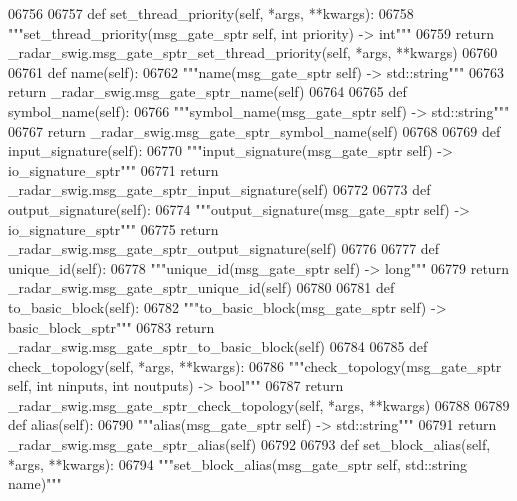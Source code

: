 \begin{DoxyCode}
{{{{{{{{{{{{{{{{{{{{{{06756 
06757     \textcolor{keyword}{def }set_thread_priority(self, *args, **kwargs):
06758         \textcolor{stringliteral}{"""set\_thread\_priority(msg\_gate\_sptr self, int priority) -> int"""}
06759         \textcolor{keywordflow}{return} \_radar\_swig.msg\_gate\_sptr\_set\_thread\_priority(self, *args, **kwargs)
06760 
06761     \textcolor{keyword}{def }name(self):
06762         \textcolor{stringliteral}{"""name(msg\_gate\_sptr self) -> std::string"""}
06763         \textcolor{keywordflow}{return} \_radar\_swig.msg\_gate\_sptr\_name(self)
06764 
06765     \textcolor{keyword}{def }symbol_name(self):
06766         \textcolor{stringliteral}{"""symbol\_name(msg\_gate\_sptr self) -> std::string"""}
06767         \textcolor{keywordflow}{return} \_radar\_swig.msg\_gate\_sptr\_symbol\_name(self)
06768 
06769     \textcolor{keyword}{def }input_signature(self):
06770         \textcolor{stringliteral}{"""input\_signature(msg\_gate\_sptr self) -> io\_signature\_sptr"""}
06771         \textcolor{keywordflow}{return} \_radar\_swig.msg\_gate\_sptr\_input\_signature(self)
06772 
06773     \textcolor{keyword}{def }output_signature(self):
06774         \textcolor{stringliteral}{"""output\_signature(msg\_gate\_sptr self) -> io\_signature\_sptr"""}
06775         \textcolor{keywordflow}{return} \_radar\_swig.msg\_gate\_sptr\_output\_signature(self)
06776 
06777     \textcolor{keyword}{def }unique_id(self):
06778         \textcolor{stringliteral}{"""unique\_id(msg\_gate\_sptr self) -> long"""}
06779         \textcolor{keywordflow}{return} \_radar\_swig.msg\_gate\_sptr\_unique\_id(self)
06780 
06781     \textcolor{keyword}{def }to_basic_block(self):
06782         \textcolor{stringliteral}{"""to\_basic\_block(msg\_gate\_sptr self) -> basic\_block\_sptr"""}
06783         \textcolor{keywordflow}{return} \_radar\_swig.msg\_gate\_sptr\_to\_basic\_block(self)
06784 
06785     \textcolor{keyword}{def }check_topology(self, *args, **kwargs):
06786         \textcolor{stringliteral}{"""check\_topology(msg\_gate\_sptr self, int ninputs, int noutputs) -> bool"""}
06787         \textcolor{keywordflow}{return} \_radar\_swig.msg\_gate\_sptr\_check\_topology(self, *args, **kwargs)
06788 
06789     \textcolor{keyword}{def }alias(self):
06790         \textcolor{stringliteral}{"""alias(msg\_gate\_sptr self) -> std::string"""}
06791         \textcolor{keywordflow}{return} \_radar\_swig.msg\_gate\_sptr\_alias(self)
06792 
06793     \textcolor{keyword}{def }set_block_alias(self, *args, **kwargs):
06794         \textcolor{stringliteral}{"""set\_block\_alias(msg\_gate\_sptr self, std::string name)"""}
}}}}}}}}}}}}}}}}}}}}}}
\end{DoxyCode}
